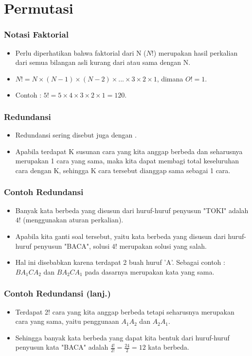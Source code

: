 \section{Permutasi}
\frame{\sectionpage}

\begin{frame}
\frametitle{Notasi Faktorial}
\begin{itemize}
  \item Perlu diperhatikan bahwa faktorial dari N ($N!$) merupakan hasil perkalian dari semua bilangan asli kurang dari atau sama dengan N.
  \item $N! = N \times (N-1) \times (N-2) \times ... \times 3 \times 2 \times 1$, dimana $O! = 1$.
  \item Contoh : $5! = 5 \times 4 \times 3 \times 2 \times 1 = 120$.
\end{itemize}
\end{frame}

\begin{frame}
\frametitle{Redundansi}
\begin{itemize}
  \item Redundansi sering disebut juga dengan .
  \item Apabila terdapat K susunan cara yang kita anggap berbeda dan seharusnya merupakan 1 cara yang sama, maka kita dapat membagi total keseluruhan cara dengan K, sehingga K cara tersebut dianggap sama sebagai 1 cara.
\end{itemize}
\end{frame}

\begin{frame}
\frametitle{Contoh Redundansi}
\begin{itemize}
  \item Banyak kata berbeda yang disusun dari huruf-huruf penyusun "TOKI" adalah $4!$ (menggunakan aturan perkalian).
  \item Apabila kita ganti soal tersebut, yaitu kata berbeda yang disusun dari huruf-huruf penyusun "BACA", solusi $4!$ merupakan solusi yang salah.
  \item Hal ini disebabkan karena terdapat 2 buah huruf 'A'. Sebagai contoh : $BA_{1}CA_{2}$ dan $BA_{2}CA_{1}$ pada dasarnya merupakan kata yang sama.
\end{itemize}
\end{frame}

\begin{frame}
\frametitle{Contoh Redundansi (lanj.)}
\begin{itemize}
  \item Terdapat 2! cara yang kita anggap berbeda tetapi seharusnya merupakan cara yang sama, yaitu penggunaan $A_{1}A_{2}$ dan $A_{2}A_{1}$.
  \item Sehingga banyak kata berbeda yang dapat kita bentuk dari huruf-huruf penyusun kata "BACA" adalah $\frac{4!}{2!} = \frac{24}{2} = 12$ kata berbeda.
\end{itemize}
\end{frame}


